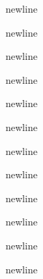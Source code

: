 newline

newline

newline

newline

newline

newline

newline

newline

newline

newline

newline

newline








    
